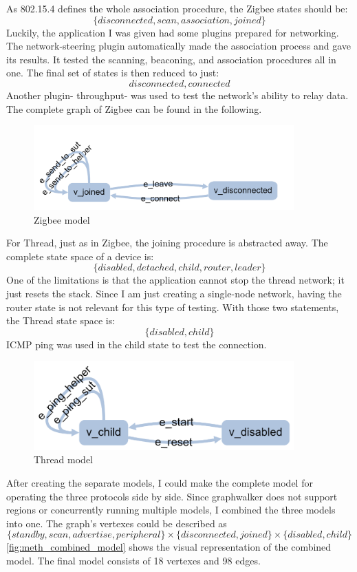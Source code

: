 As 802.15.4 defines the whole association procedure, the Zigbee states should be: \[
    \{disconnected, scan, association, joined\}
\] Luckily, the application I was given had some plugins prepared for networking. The network-steering plugin automatically made the association process and gave its results. It tested the scanning, beaconing, and association procedures all in one. The final set of states is then reduced to just: \[
    {disconnected, connected}
\] Another plugin- throughput- was used to test the network's ability to relay data. The complete graph of Zigbee can be found in the following.

\begin{figure}
    \includegraphics[width=100mm, keepaspectratio]{figures/model_zigbee_final.png}
    \caption{Zigbee model}
\end{figure}

For Thread, just as in Zigbee, the joining procedure is abstracted away.
The complete state space of a device is: \[
    \{disabled, detached, child, router, leader\}
\] One of the limitations is that the application cannot stop the thread network; it just resets the stack. Since I am just creating a single-node network, having the router state is not relevant for this type of testing. With those two statements, the Thread state space is: \[
    \{disabled, child\}
\] ICMP ping was used in the child state to test the connection.

\begin{figure}
    \includegraphics[width=100mm, keepaspectratio]{figures/model_thread_finished.png}
    \caption{Thread model}
\end{figure}

After creating the separate models, I could make the complete model for operating the three protocols side by side. Since graphwalker does not support regions or concurrently running multiple models, I combined the three models into one. The graph's vertexes could be described as \[
    \{standby, scan, advertise, peripheral\} \times  \{disconnected, joined\} \times \{disabled, child\}
\]
\autoref{fig:meth_combined_model} shows the visual representation of the combined model. The final model consists of 18 vertexes and 98 edges.

